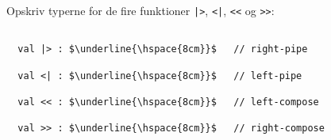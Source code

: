 Opskriv typerne for de fire
funktioner \lstinline{|>}, \lstinline{<|}, \lstinline{<<}
og \lstinline{>>}:
\begin{lstlisting}[mathescape]

  val |> : $\underline{\hspace{8cm}}$   // right-pipe

  val <| : $\underline{\hspace{8cm}}$   // left-pipe

  val << : $\underline{\hspace{8cm}}$   // left-compose

  val >> : $\underline{\hspace{8cm}}$   // right-compose
\end{lstlisting}
